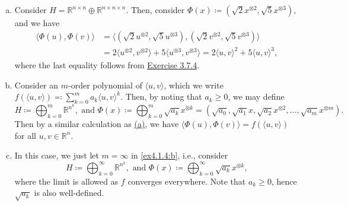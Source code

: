 \begin{answer}
	\begin{enumerate}[(a)]
		\item Consider \(H = \mathbb{R} ^{n\times n} \oplus \mathbb{R} ^{n \times n \times n}\). Then, consider \(\Phi (x) \coloneqq (\sqrt{2} x^{\otimes 2}, \sqrt{5} x^{\otimes 3} )\), and we have
		      \[
			      \begin{split}
				      \langle \Phi (u), \Phi (v) \rangle
				       & = \langle (\sqrt{2} u^{\otimes 2}, \sqrt{5} u^{\otimes 3} ) , (\sqrt{2} v^{\otimes 2} , \sqrt{5} v^{\otimes 3}) \rangle \\
				       & = 2 \langle u^{\otimes 2}, v^{\otimes 2} \rangle + 5\langle u^{\otimes 3}, v^{\otimes 3} \rangle
				      = 2\langle u, v \rangle ^2 + 5\langle u, v \rangle ^3,
			      \end{split}
		      \]
		      where the last equality follows from \hyperref[ex3.7.4]{Exercise 3.7.4}.
		\item Consider an \(m\)-order polynomial of \(\langle u, v \rangle \), which we write \(f(\langle u, v \rangle ) \eqqcolon \sum_{k=0}^{m} a_k \langle u, v \rangle ^k\). Then, by noting that \(a_k \geq 0\), we may define
		      \[
			      H\coloneqq \bigoplus_{k=0}^m \mathbb{R} ^{n^k}, \text{ and }
			      \Phi (x) \coloneqq \bigoplus_{k=0}^{m} \sqrt{a_k} x^{\otimes k} = (\sqrt{a_0} , \sqrt{a_1} x, \sqrt{a_2} x^{\otimes 2}, \dots , \sqrt{a_m} x^{\otimes m}).
		      \]
		      Then by a similar calculation as \hyperref[ex3.7.5:a]{(a)}, we have \(\langle \Phi (u), \Phi (v) \rangle = f(\langle u, v \rangle )\) for all \(u, v \in \mathbb{R} ^n\).
		\item In this case, we just let \(m = \infty \) in \hyperref[ex3.7.5:b]{\autoref{ex4.1.4:b}}, i.e., consider
		      \[
			      H\coloneqq \bigoplus_{k=0}^{\infty} \mathbb{R} ^{n^k}, \text{ and }
			      \Phi (x) \coloneqq \bigoplus_{k=0}^{\infty } \sqrt{a_k} x^{\otimes k} ,
		      \]
		      where the limit is allowed as \(f\) converges everywhere. Note that \(a_k \geq 0\), hence \(\sqrt{a_k} \) is also well-defined.
	\end{enumerate}
\end{answer}

